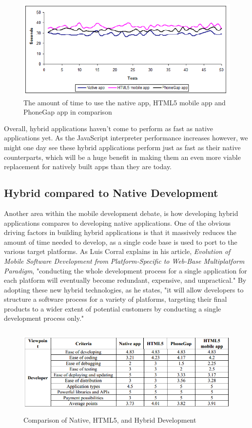 \documentclass[11pt, twocolumn]{article}
\begin{document}
\begin{figure}[h]
\includegraphics[scale=0.4]{huy-app-performance}
\caption{The amount of time to use the native app, HTML5 mobile app and PhoneGap app in comparison ~\cite{Huy2012}}
\end{figure}

Overall, hybrid applications haven't come to perform as fast as native applications yet. As the JavaScript interpreter performance increases however, we might one day see these hybrid applications perform just as fast as their native counterparts, which will be a huge benefit in making them an even more viable replacement for natively built apps than they are today.

\subsection{Hybrid compared to Native Development}
Another area within the mobile development debate, is how developing hybrid applications compares to developing native applications.  One of the obvious driving factors in building hybrid applications is that it massively reduces the amount of time needed to develop, as a single code base is used to port to the various target platforms.  As Luis Corral explains in his article, {\it Evolution of Mobile Software Development from Platform-Specific to Web-Base Multiplatform Paradigm}, "conducting the whole development process for a single application for each platform will eventually become redundant, expensive, and unpractical."  By adopting these new hybrid technologies, as he states, "it will allow developers to structure a software process for a variety of platforms, targeting their final products to a wider extent of potential customers by conducting a single development process only." ~\cite{Corral2011}\\

\begin{figure}
\includegraphics[width=\textwidth, height=4.5cm]{hybrid-native-compare-table}
\caption{Comparison of Native, HTML5, and Hybrid Development ~\cite{Huy2012}}
\end{figure}
\end{document}
